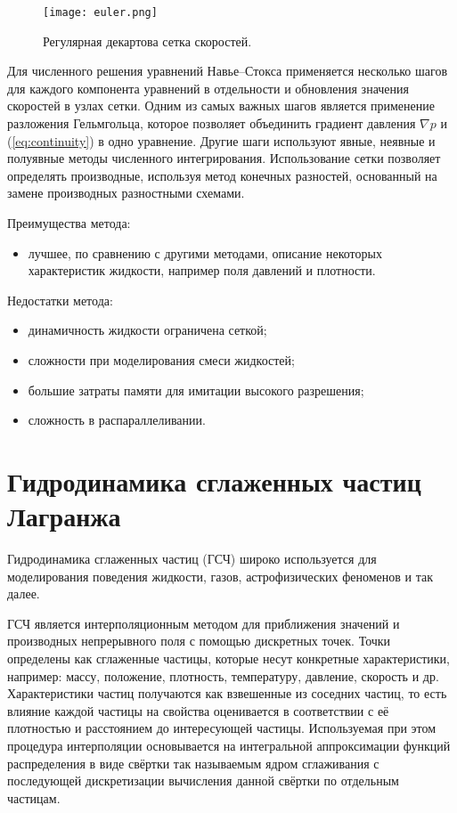 \begin{figure}[h]
  \centering
  \texttt{[image: euler.png]}
  \caption{Регулярная декартова сетка скоростей.}
\end{figure}

Для численного решения уравнений Навье--Стокса применяется несколько шагов для каждого компонента уравнений в отдельности и обновления значения скоростей в узлах сетки. Одним из самых важных шагов является применение разложения Гельмгольца, которое позволяет объединить градиент давления $\nabla p$ и (\ref{eq:continuity}) в одно уравнение. Другие шаги используют явные, неявные и полуявные методы численного интегрирования. Использование сетки позволяет определять производные, используя метод конечных разностей, основанный на замене производных разностными схемами.

Преимущества метода:
\begin{itemize}
  \item лучшее, по сравнению с другими методами, описание некоторых характеристик жидкости, например поля давлений и плотности.
\end{itemize}

Недостатки метода:
\begin{itemize}
  \item динамичность жидкости ограничена сеткой;
  \item сложности при моделирования смеси жидкостей;
  \item большие затраты памяти для имитации высокого разрешения;
  \item сложность в распараллеливании.
\end{itemize}


\section{Гидродинамика сглаженных частиц Лагранжа}
Гидродинамика сглаженных частиц (ГСЧ) широко используется для моделирования поведения жидкости, газов, астрофизических феноменов и так далее.

ГСЧ является интерполяционным методом для приближения значений и производных непрерывного поля с помощью дискретных точек. Точки определены как сглаженные частицы, которые несут конкретные характеристики, например: массу, положение, плотность, температуру, давление, скорость и др. Характеристики частиц получаются как взвешенные из соседних частиц, то есть влияние каждой частицы на свойства оценивается в соответствии с её плотностью и расстоянием до интересующей частицы. Используемая при этом процедура интерполяции основывается на интегральной аппроксимации функций распределения в виде свёртки так называемым ядром сглаживания с последующей дискретизации вычисления данной свёртки по отдельным частицам.

